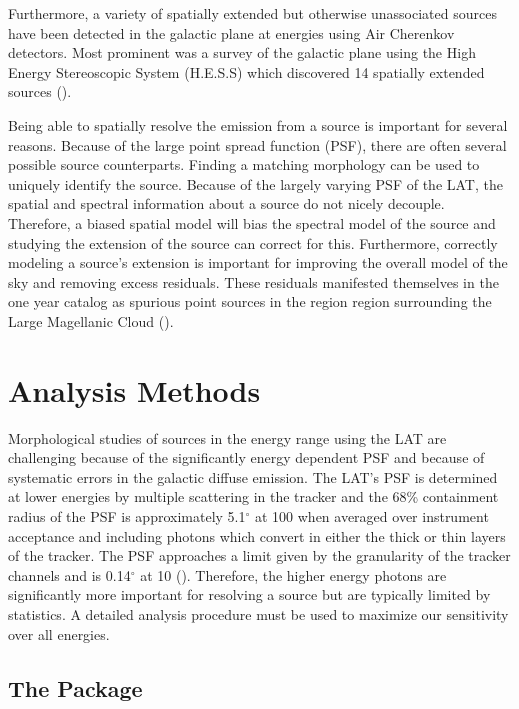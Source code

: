 \documentclass[12pt,preprint]{aastex}
\newcommand{\mev}{\text{MeV}\xspace}
\newcommand{\gev}{\text{GeV}\xspace}
\newcommand{\tev}{\text{TeV}\xspace}
\renewcommand{\deg}{\ensuremath{^\circ}\xspace}
\newcommand{\pointlike}{\text{\em pointlike}\xspace}
\begin{document}
Furthermore, a variety of spatially extended but otherwise unassociated
sources have been detected in the galactic plane at \tev energies using
Air Cherenkov detectors. Most prominent was a survey of the galactic plane
using the High Energy Stereoscopic System (H.E.S.S) which discovered 14
spatially extended sources (\cite{HESS_plane_survey}).

Being able to spatially resolve the \gev emission from a source is
important for several reasons. Because of the large point spread
function (PSF), there are often several possible source counterparts.
Finding a matching morphology can be used to uniquely identify the source.
Because of the largely varying PSF of the LAT, the spatial and spectral
information about a source do not nicely decouple. Therefore, a biased
spatial model will bias the spectral model of the source and studying
the extension of the source can correct for this.  Furthermore, correctly
modeling a source's extension is important for improving the overall model
of the sky and removing excess residuals.  These residuals manifested
themselves in the one year catalog as spurious point sources in the
region region surrounding the Large Magellanic Cloud (\cite{first_cat}).


\section{Analysis Methods}

Morphological studies of sources in the \gev energy range
using the LAT are challenging because of the significantly energy
dependent PSF and because of systematic errors in the galactic diffuse
emission.  The LAT's PSF is determined at lower energies by multiple
scattering in the tracker and the 68\% containment radius of the PSF is
approximately 5.1\deg at 100 \mev  when averaged over instrument acceptance
and including photons which convert in either the thick or thin layers of
the tracker. The PSF approaches a limit given by the granularity of the
tracker channels and is 0.14\deg at 10 \gev (\cite{on_orbit_calibration}).
Therefore, the higher energy photons are significantly more important for
resolving a source but are typically limited by statistics. 
A detailed analysis procedure must be used to maximize our
sensitivity over all energies.

\subsection{The \pointlike Package}
\end{document}
